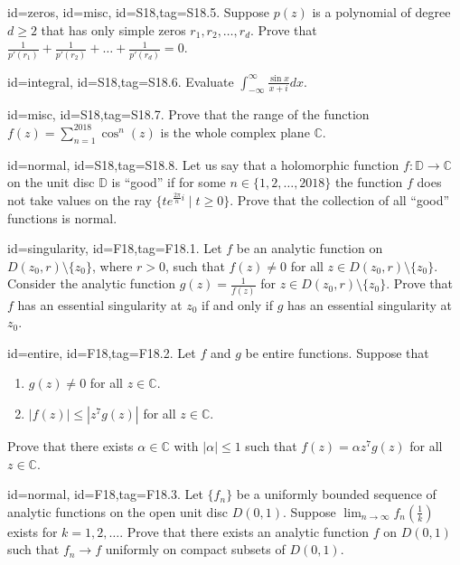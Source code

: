 \documentclass[12pt,letterpaper]{article}
\theoremstyle{plain}
\theoremstyle{definition}
\begin{document}
{\item[id=zeros, id=misc, id=S18,tag=S18.5.]
Suppose $p(z)$ is a polynomial of degree $d \ge 2$ that has only simple zeros $r_1,r_2,\ldots, r_d$. Prove that $\frac{1}{p'(r_1)} + \frac{1}{p'(r_2)} + \ldots + \frac{1}{p'(r_d)} = 0$.

\item[id=integral, id=S18,tag=S18.6.]
Evaluate $\int_{-\infty}^{\infty} \frac{\sin x}{x + i} dx$.

\item[id=misc, id=S18,tag=S18.7.]
Prove that the range of the function $f(z) = \sum_{n=1}^{2018} \cos^n(z)$ is the whole complex plane $\mathbb{C}$.

\item[id=normal, id=S18,tag=S18.8.]
Let us say that a holomorphic function $f : \mathbb{D} \rightarrow \mathbb{C}$ on the unit disc $\mathbb{D}$ is ``good'' if for some $n \in \{1,2,\ldots,2018\}$ the function $f$ does not take values on the ray $\{t e^{\frac{2\pi}{n} i} \mid t \ge 0\}$. Prove that the collection of all ``good'' functions is normal.


\item[id=singularity, id=F18,tag=F18.1.]
Let $f$ be an analytic function on $D(z_0, r) \setminus \{z_0\}$, where $r > 0$, such that $f(z) \ne 0$ for all $z \in D(z_0, r) \setminus \{z_0\}$. Consider the analytic function $g(z) = \frac{1}{f(z)}$ for $z \in D(z_0, r) \setminus \{z_0\}$. Prove that $f$ has an essential singularity at $z_0$ if and only if $g$ has an essential singularity at $z_0$.
\item[id=entire, id=F18,tag=F18.2.]
Let $f$ and $g$ be entire functions. Suppose that
\begin{enumerate}[label=(\alph*)]\onlyitems
\item $g(z) \ne 0$ for all $z \in \mathbb{C}$.
\item $| f(z) | \le | z^7 g(z) |$ for all $z \in \mathbb{C}$.
\end{enumerate}
Prove that there exists $\alpha \in \mathbb{C}$ with $| \alpha | \le 1$ such that $f(z) = \alpha z^7 g(z)$ for all $z \in \mathbb{C}$.
\item[id=normal, id=F18,tag=F18.3.]
Let $\{f_n\}$ be a uniformly bounded sequence of analytic functions on the open unit disc $D(0,1)$. Suppose $\lim_{n\rightarrow \infty} f_n(\frac{1}{k})$ exists for $k = 1,2,\ldots$. Prove that there exists an analytic function $f$ on $D(0,1)$ such that $f_n \rightarrow f$ uniformly on compact subsets of $D(0,1)$.

}
\end{document}
